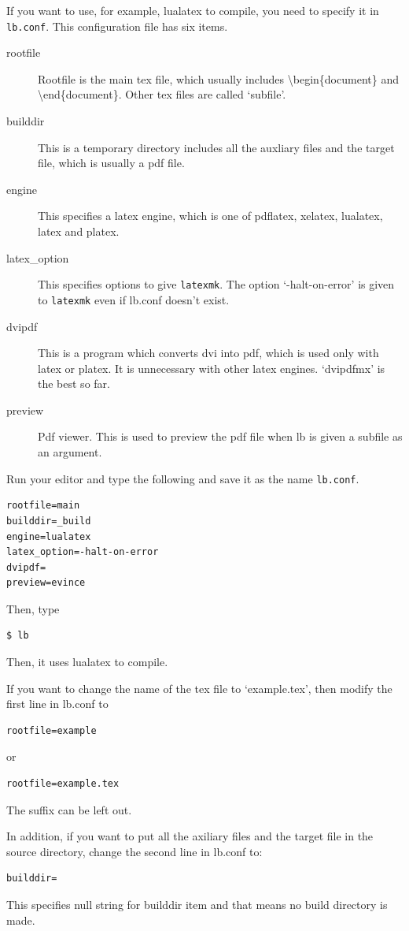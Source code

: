 If you want to use, for example, lualatex to compile, you need to specify it in \verb|lb.conf|.
This configuration file has six items.
\begin{description}
\item[rootfile] Rootfile is the main tex file, which usually includes {\textbackslash}begin\{document\} and {\textbackslash}end\{document\}. Other tex files are called `subfile'.
\item[builddir] This is a temporary directory includes all the auxliary files and the target file, which is usually a pdf file.
\item[engine] This specifies a latex engine, which is one of pdflatex, xelatex, lualatex, latex and platex.
\item[latex\_option] This specifies options to give \verb|latexmk|. The option `-halt-on-error' is given to \verb|latexmk| even if lb.conf doesn't exist.
\item[dvipdf] This is a program which converts dvi into pdf, which is used only with latex or platex. It is unnecessary with other latex engines. `dvipdfmx' is the best so far.
\item[preview] Pdf viewer. This is used to preview the pdf file when lb is given a subfile as an argument.
\end{description}

Run your editor and type the following and save it as the name \verb|lb.conf|.
\begin{verbatim}
rootfile=main
builddir=_build
engine=lualatex
latex_option=-halt-on-error
dvipdf=
preview=evince
\end{verbatim}
Then, type
\begin{verbatim}
$ lb
\end{verbatim}
Then, it uses lualatex to compile.

If you want to change the name of the tex file to `example.tex', then modify the first line in lb.conf to
\begin{verbatim}
rootfile=example
\end{verbatim}
or
\begin{verbatim}
rootfile=example.tex
\end{verbatim}
The suffix can be left out.

In addition, if you want to put all the axiliary files and the target file in the source directory, change the second line in lb.conf to:
\begin{verbatim}
builddir=
\end{verbatim}
This specifies null string for builddir item and that means no build directory is made.

